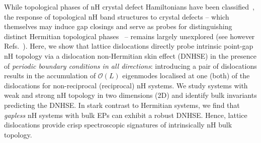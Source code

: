\documentclass[aps,prl,twocolumn,amsmath,amssymb,floatfix,superscriptaddress]{revtex4-2}
\begin{document}
While topological phases of nH crystal defect Hamiltonians have been classified~\cite{NHDefectClass19}, the response of topological nH band structures to crystal defects -- which themselves may induce gap closings and serve as probes for distinguishing distinct Hermitian topological phases~\cite{AshvinScrewTI,TeoKaneDefect,ran2010weak,Vlad2D,VladScrewTI,slager2019,OurDefectPaper} -- remains largely unexplored (see however Refs.~). %
Here, we show that lattice dislocations directly probe intrinsic point-gap nH topology via a dislocation non-Hermitian skin effect (DNHSE) in the presence of \emph{periodic boundary conditions in all directions}: introducing a pair of dislocations results in the accumulation of $\mathcal{O}(L)$ eigenmodes localised at one (both) of the dislocations for non-reciprocal (reciprocal) nH systems. We study systems with weak and strong nH topology in two dimensions (2D) and identify bulk invariants predicting the DNHSE. In stark contrast to Hermitian systems, we find that \textit{gapless} nH systems with bulk EPs can exhibit a robust DNHSE. Hence, lattice dislocations provide crisp spectroscopic signatures of intrinsically nH bulk topology. 
\end{document}
